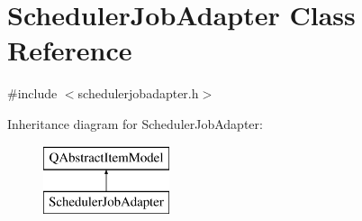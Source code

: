 \hypertarget{class_scheduler_job_adapter}{}\section{Scheduler\+Job\+Adapter Class Reference}
\label{class_scheduler_job_adapter}


{\ttfamily \#include $<$schedulerjobadapter.\+h$>$}

Inheritance diagram for Scheduler\+Job\+Adapter\+:\begin{figure}[H]
\begin{center}
\leavevmode
\includegraphics[height=2.000000cm]{d2/ddf/class_scheduler_job_adapter}
\end{center}
\end{figure}
